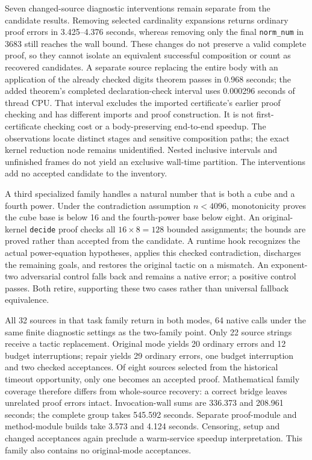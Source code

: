 \documentclass[10pt,twocolumn]{article}
\begin{document}
Seven changed-source diagnostic interventions remain separate from the
candidate results. Removing selected cardinality expansions returns ordinary
proof errors in 3.425--4.376 seconds, whereas removing only the final
\texttt{norm\_num} in 3683 still reaches the wall bound.
These changes do not preserve a valid complete proof, so they cannot isolate
an equivalent successful composition or count as recovered candidates.
A separate source replacing the entire body with an application of the
already checked digits theorem passes in 0.968 seconds; the added theorem's
completed declaration-check interval uses 0.000296 seconds of thread CPU.
That interval excludes the imported certificate's earlier proof checking
and has different imports and proof construction. It is not first-certificate
checking cost or a body-preserving end-to-end speedup.
The observations locate distinct stages and sensitive composition paths;
the exact kernel reduction node remains unidentified. Nested inclusive
intervals and unfinished frames do not yield an exclusive wall-time
partition. The interventions add no accepted candidate to the inventory.

A third specialized family handles a natural number that is both a cube
and a fourth power. Under the contradiction assumption $n<4096$, monotonicity
proves the cube base is below 16 and the fourth-power base below eight.
An original-kernel \texttt{decide} proof checks all $16\times8=128$ bounded
assignments; the bounds are proved rather than accepted from the candidate.
A runtime hook recognizes the actual power-equation hypotheses, applies this
checked contradiction, discharges the remaining goals, and restores the
original tactic on a mismatch. An exponent-two adversarial control falls
back and remains a native error; a positive control passes. Both retire,
supporting these two cases rather than universal fallback equivalence.

All 32 sources in that task family return in both modes, 64 native calls
under the same finite diagnostic settings as the two-family point.
Only 22 source strings receive a tactic replacement. Original mode yields
20 ordinary errors and 12 budget interruptions; repair yields 29 ordinary
errors, one budget interruption and two checked acceptances. Of eight
sources selected from the historical timeout opportunity, only one becomes
an accepted proof. Mathematical family coverage therefore differs from
whole-source recovery: a correct bridge leaves unrelated proof errors intact.
Invocation-wall sums are 336.373 and 208.961 seconds; the complete group
takes 545.592 seconds. Separate proof-module and method-module builds take
3.573 and 4.124 seconds. Censoring, setup and changed acceptances again
preclude a warm-service speedup interpretation. This family also contains
no original-mode acceptances.
\end{document}
